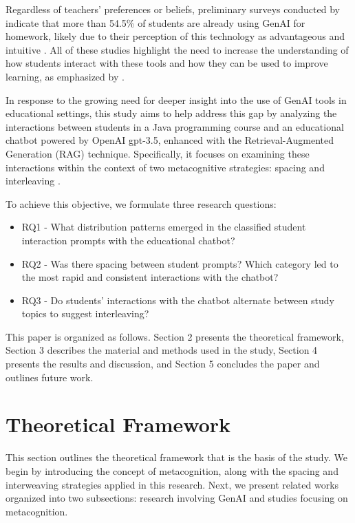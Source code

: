 \documentclass[runningheads]{llncs}
\begin{document}
Regardless of teachers' preferences or beliefs, preliminary surveys conducted
by \cite{Dickey24} indicate that more than 54.5\% of students are already using
GenAI for homework, likely due to their perception of this technology as
advantageous and intuitive \cite{Boudouaia24}. All of these studies highlight
the need to increase the understanding of how students interact with these tools
and how they can be used to improve learning, as emphasized by \cite{Lo24}.

In response to the growing need for deeper insight into the use of GenAI tools
in educational settings, this study aims to help address this gap by analyzing
the interactions between students in a Java programming course and an
educational chatbot powered by OpenAI gpt-3.5, enhanced with the
Retrieval-Augmented Generation (RAG) technique. Specifically, it focuses on
examining these interactions within the context of two metacognitive strategies:
spacing \cite{Carvalho20} and interleaving \cite{Rivers21}.

To achieve this
objective, we formulate three research questions:

\begin{itemize}
  \item RQ1 - What distribution patterns emerged in the classified student
  interaction prompts with the educational chatbot?
  \item RQ2 - Was there spacing between student prompts? Which category led to
  the most rapid and consistent interactions with the chatbot?
  \item RQ3 - Do students' interactions with the chatbot alternate between study
  topics to suggest interleaving?
\end{itemize}

This paper is organized as follows. Section 2 presents the theoretical
framework, Section 3 describes the material and methods used in the study,
Section 4 presents the results and discussion, and Section 5 concludes the
paper and outlines future work.

\section{Theoretical Framework}

This section outlines the theoretical framework that is the basis of the study.
We begin by introducing the concept of metacognition, along with the spacing and
interweaving strategies applied in this research. Next, we present related works
organized into two subsections: research involving GenAI and studies focusing
on metacognition.
\end{document}

